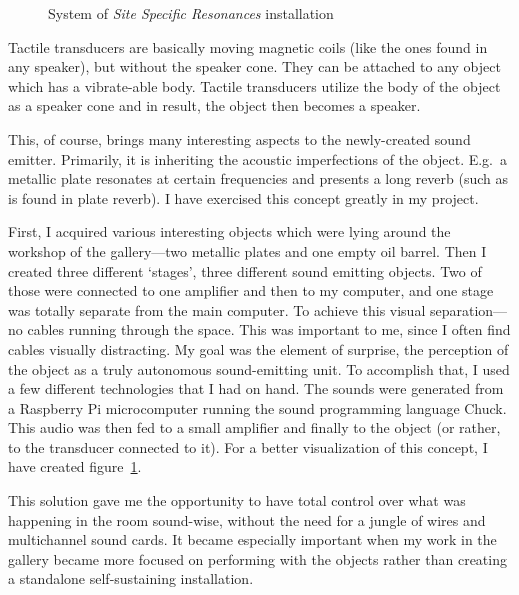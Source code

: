 \documentclass[12pt,a4paper,oneside]{report}
\begin{document}
\begin{figure}
        \caption{System of \emph{Site Specific Resonances} installation}
        \label{fig:sitespec}
\end{figure}


Tactile transducers are basically moving magnetic coils (like the ones found in any speaker), but without the speaker cone. They can be attached to any object which has a vibrate-able body. Tactile transducers utilize the body of the object as a speaker cone and in result, the object then becomes a speaker. 

This, of course, brings many interesting aspects to the newly-created sound emitter. Primarily, it is inheriting the acoustic imperfections of the object. E.g.\ a metallic plate resonates at certain frequencies and presents a long reverb (such as is found in plate reverb). I have exercised this concept greatly in my project.

First, I acquired various interesting objects which were lying around the workshop of the gallery---two metallic plates and one empty oil barrel. Then I created three different `stages', three different sound emitting objects. Two of those were connected to one amplifier and then to my computer, and one stage was totally separate from the main computer. To achieve this visual separation---no cables running through the space. This was important to me, since I often find cables visually distracting. My goal was the element of surprise, the perception of the object as a truly autonomous sound-emitting unit. To accomplish that, I used a few different technologies that I had on hand. The sounds were generated from a Raspberry Pi microcomputer running the sound programming language Chuck. This audio was then fed to a small amplifier and finally to the object (or rather, to the transducer connected to it). For a better visualization of this concept, I have created figure~\ref{fig:sitespec}.

This solution gave me the opportunity to have total control over what was happening in the room sound-wise, without the need for a jungle of wires and multichannel sound cards. It became especially important when my work in the gallery became more focused on performing with the objects rather than creating a standalone self-sustaining installation.
\end{document}
